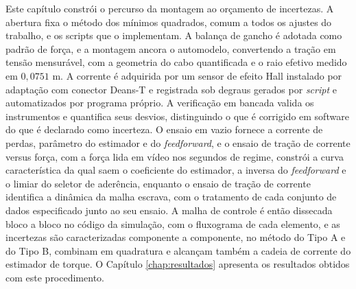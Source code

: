 Este capítulo constrói o percurso da montagem ao orçamento de incertezas. A abertura fixa
o método dos mínimos quadrados, comum a todos os ajustes do trabalho, e os scripts que
o implementam. A balança de gancho
é adotada como padrão de força, e a montagem ancora o automodelo, convertendo a tração em
tensão mensurável, com a geometria do cabo quantificada e o raio efetivo medido em
$0{,}0751$ m. A corrente é adquirida por um sensor de efeito Hall instalado por adaptação
com conector Deans-T e registrada sob degraus gerados por
\emph{script} e automatizados por programa próprio. A verificação em bancada valida os
instrumentos e quantifica seus desvios, distinguindo o que é corrigido em software do que
é declarado como incerteza. O ensaio em vazio fornece a corrente de perdas, parâmetro do
estimador e do \emph{feedforward}, e o ensaio de tração de corrente versus força, com a
força lida em vídeo nos segundos de regime, constrói a curva característica da qual saem
o coeficiente do estimador, a inversa do \emph{feedforward} e o limiar do seletor de
aderência, enquanto o ensaio de tração de corrente identifica a dinâmica da malha escrava,
com o tratamento de cada conjunto de dados especificado junto ao seu ensaio. A malha de
controle é então dissecada bloco a bloco no código da simulação, com o fluxograma de cada
elemento, e as incertezas são caracterizadas componente a componente, no método do Tipo
A e do Tipo
B, combinam em quadratura e alcançam também a cadeia de corrente do estimador de torque. O Capítulo \ref{chap:resultados}
apresenta os resultados obtidos com este procedimento.

\clearpage
